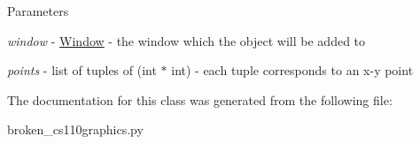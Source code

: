 \begin{DoxyParams}{Parameters}
\item[{\em window}]-\/ \hyperlink{classbroken__cs110graphics_1_1Window}{Window} -\/ the window which the object will be added to \item[{\em points}]-\/ list of tuples of (int $\ast$ int) -\/ each tuple corresponds to an x-\/y point \end{DoxyParams}


The documentation for this class was generated from the following file:\begin{DoxyCompactItemize}
\item 
broken\_\-cs110graphics.py\end{DoxyCompactItemize}

